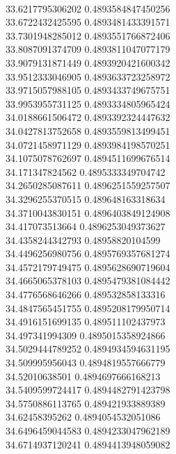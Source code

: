 { \\
33.6217795306202 0.4893584847450256
 \\
33.6722432425595 0.4893481433391571
 \\
33.7301948285012 0.4893551766872406
 \\
33.8087091374709 0.4893811047077179
 \\
33.9079131871449 0.4893920421600342
 \\
33.9512333046905 0.4893633723258972
 \\
33.9715057988105 0.4893433749675751
 \\
33.9953955731125 0.4893334805965424
 \\
34.0188661506472 0.4893392324447632
 \\
34.0427813752658 0.4893559813499451
 \\
34.0721458971129 0.4893984198570251
 \\
34.1075078762697 0.4894511699676514
 \\
34.171347824562 0.4895333349704742
 \\
34.2650285087611 0.4896251559257507
 \\
34.3296255370515 0.489648163318634
 \\
34.3710043830151 0.4896403849124908
 \\
34.417073513664 0.4896253049373627
 \\
34.4358244342793 0.48958820104599
 \\
34.4496256980756 0.4895769357681274
 \\
34.4572179749475 0.4895628690719604
 \\
34.4665065378103 0.4895479381084442
 \\
34.4776568646266 0.489532858133316
 \\
34.4847565451755 0.4895208179950714
 \\
34.4916151699135 0.489511102437973
 \\
34.497341994309 0.4895015358924866
 \\
34.5029444789252 0.4894934594631195
 \\
34.509995956043 0.4894819557666779
 \\
34.52010638501 0.4894697666168213
 \\
34.5409599724417 0.4894482791423798
 \\
34.5750886113765 0.489421933889389
 \\
34.62458395262 0.4894054532051086
 \\
34.6496459044583 0.4894233047962189
 \\
34.6714937120241 0.4894413948059082
}
